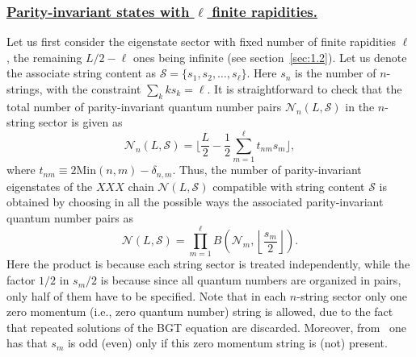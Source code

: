 \documentclass[11pt]{iopart}
\begin{document}
\subsubsection{\underline{Parity-invariant states with $\ell$ finite rapidities.}}
\label{app-1.1}

Let us first consider the eigenstate sector with fixed number of finite rapidities 
$\ell$, the remaining $L/2-\ell$ ones being infinite (see section~\ref{sec:1.2}). 
Let us denote the associate string content as ${\mathcal S}=\{s_1,s_2,\dots,
s_{\ell}\}$. Here $s_n$ is the number of $n$-strings, with the constraint 
$\sum_k ks_k=\ell$. It is straightforward to check that the total number of 
parity-invariant quantum number pairs ${\mathcal N}_n(L,{\mathcal S})$ in the 
$n$-string sector is given as 
%
\begin{equation}
\label{NnLS}
{\mathcal N}_n(L,{\mathcal S})=\Big\lfloor\frac{L}{2}-\frac{1}{2}
\sum_{m=1}^{\ell}t_{nm}s_m\Big\rfloor,
\end{equation}
%
where $t_{nm}\equiv 2\textrm{Min}(n,m)-\delta_{n,m}$. Thus, the number of parity-invariant 
eigenstates of the $XXX$ chain ${\mathcal N}(L,{\mathcal S})$ compatible with string content 
${\mathcal S}$ is obtained by choosing in all the possible ways the associated parity-invariant 
quantum number pairs as     
%
\begin{equation}
\label{NLS}
{\mathcal N}(L,{\mathcal S})=\prod_{m=1}^{\ell} B\left({\mathcal N}_m,\left\lfloor
\frac{s_m}{2}\right\rfloor\right).
\end{equation}
%
Here the product is because each string sector is treated independently, while the 
factor $1/2$ in $s_m/2$ is because since all quantum numbers are organized in pairs, 
only half of them have to be specified. Note that in each $n$-string sector only one 
zero momentum (i.e., zero quantum number) string is allowed, due to the fact that 
repeated solutions of the BGT equation are discarded. Moreover, from~ one has 
that $s_m$ is odd (even) only if this zero momentum string is (not) present. 
\end{document}
